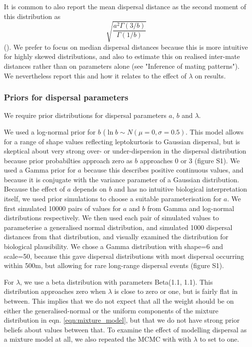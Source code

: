 \documentclass[10pt, a4paper, twocolumn]{article} %
\begin{document}
It is common to also report the mean dispersal distance as the second moment of this distribution as
\begin{equation}
\label{eqn:sd_GND}    
\sqrt{ \frac{ a^2 \Gamma(3/b) }{ \Gamma(1/b) } }
\end{equation}
(\cite{Nadarajah2005}).
We prefer to focus on median dispersal distances because this is more intuitive for highly skewed distributions, and also to estimate this on realised inter-mate distances rather than on parameters alone (see "Inference of mating patterns"). We nevertheless report this and how it relates to the effect of $\lambda$ on results.

\subsubsection{Priors for dispersal parameters}

We require prior distributions for dispersal parameters $a$, $b$ and $\lambda$.

We used a log-normal prior for $b$ ($\ln b \sim N(\mu=0, \sigma = 0.5)$.
This model allows for a range of shape values reflecting leptokurtosis to Gaussian dispersal, but is skeptical about very strong over- or under-dispersion in the dispersal distribution because prior probabilties approach zero as $b$ approaches 0 or 3 (figure S1).
We used a Gamma prior for $a$ because this describes positive continuous values, and because it is conjugate with the variance parameter of a Gaussian distribution.
Because the effect of $a$ depends on $b$ and has no intuitive biological interpretation itself, we used prior simulations to choose a suitable parameterisation for $a$. We first simulated 10000 pairs of values for $a$ and $b$ from Gamma and log-normal distributions respectively. We then used each pair of simulated values to parameterise a generalised normal distribution, and simulated 1000 dispersal distances from that distribution, and visually examined the distribution for biological plausibility. We chose a Gamma distribution with shape=6 and scale=50, because this gave dispersal distributions with most dispersal occurring within 500m, but allowing for rare long-range dispersal events (figure S1).

For $\lambda$, we use a beta distribution with parameters Beta(1.1, 1.1).
This distribution approaches zero when $\lambda$ is close to zero or one, but is fairly flat in between.
This implies that we do not expect that all the weight should be on either the generalised-normal or the uniform components of the mixture distribution in eqn. \ref{eqn:mixture_model}, but that we do not have strong prior beliefs about values between that.
To examine the effect of modelling dispersal as a mixture model at all, we also repeated the MCMC with with $\lambda$ to set to one.
\end{document}
